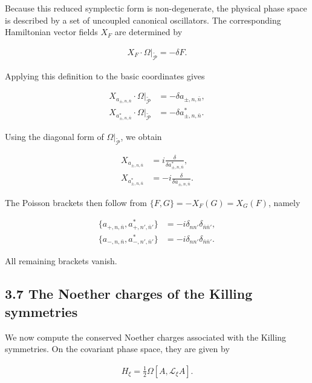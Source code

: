 Because this reduced symplectic form is non-degenerate, the physical phase space is described by a set of uncoupled canonical oscillators. The corresponding Hamiltonian vector fields $X_F$ are determined by

\begin{align}
X_F \cdot \Omega\big|_{\widetilde{\mathcal{P}}} = - \delta F.
\end{align}

Applying this definition to the basic coordinates gives

 \begin{align}
X_{a_{\pm,n,\bar{n}}} \cdot \Omega\big|_{\widetilde{\mathcal{P}}} & = - \delta a_{\pm,n,\bar{n}}, \\
X_{a^*_{\pm,n,\bar{n}}} \cdot \Omega\big|_{\widetilde{\mathcal{P}}} & = - \delta a^*_{\pm,n,\bar{n}}.
\end{align}

Using the diagonal form of $\Omega|_{\widetilde{\mathcal{P}}}$, we obtain

 \begin{align}
X_{a_{\pm,n,\bar{n}}} & = i \frac{\delta}{\delta a^*_{\pm,n,\bar{n}}}, \\
X_{a^*_{\pm,n,\bar{n}}} & = -i \frac{\delta}{\delta a_{\pm,n,\bar{n}}}.
\end{align}

The Poisson brackets then follow from $\{F,G\}=-X_F(G)=X_G(F)$, namely

 \begin{align}
\{a_{+,n,\bar{n}}, a^{*}_{+,n',\bar{n}'}\} & = -i \delta_{n n'} \delta_{\bar{n} \bar{n}'}, \\
\{a_{-,n,\bar{n}}, a^{*}_{-,n',\bar{n}'}\} & = -i \delta_{n n'} \delta_{\bar{n} \bar{n}'}.
\end{align}

All remaining brackets vanish.

\subsection{3.7 The Noether charges of the Killing symmetries}\label{subsec:noether-charges-killing}

We now compute the conserved Noether charges associated with the Killing symmetries. On the covariant phase space, they are given by

\begin{align}
H_{\xi} = \frac{1}{2} \Omega[A, \mathcal{L}_{\xi} A].
\end{align}

